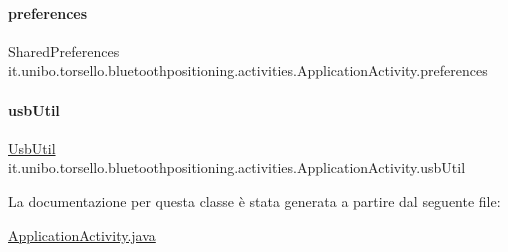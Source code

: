 \paragraph{\texorpdfstring{preferences}{preferences}}
{\footnotesize\ttfamily Shared\+Preferences it.\+unibo.\+torsello.\+bluetoothpositioning.\+activities.\+Application\+Activity.\+preferences\hspace{0.3cm}{\ttfamily [private]}}

\hypertarget{classit_1_1unibo_1_1torsello_1_1bluetoothpositioning_1_1activities_1_1ApplicationActivity_abe62157d98c81406ae3d79dbc0fd9093_abe62157d98c81406ae3d79dbc0fd9093}{}\label{classit_1_1unibo_1_1torsello_1_1bluetoothpositioning_1_1activities_1_1ApplicationActivity_abe62157d98c81406ae3d79dbc0fd9093_abe62157d98c81406ae3d79dbc0fd9093} 
\paragraph{\texorpdfstring{usb\+Util}{usbUtil}}
{\footnotesize\ttfamily \hyperlink{classit_1_1unibo_1_1torsello_1_1bluetoothpositioning_1_1util_1_1UsbUtil}{Usb\+Util} it.\+unibo.\+torsello.\+bluetoothpositioning.\+activities.\+Application\+Activity.\+usb\+Util\hspace{0.3cm}{\ttfamily [private]}}



La documentazione per questa classe è stata generata a partire dal seguente file\+:\begin{DoxyCompactItemize}
\item 
\hyperlink{ApplicationActivity_8java}{Application\+Activity.\+java}\end{DoxyCompactItemize}
